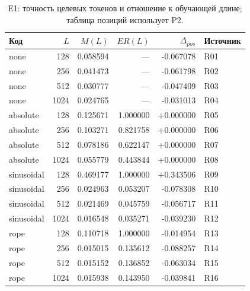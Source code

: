 \begin{table}[H]\centering\small
\setlength{\tabcolsep}{4pt}
\caption{E1: точность целевых токенов и отношение к обучающей длине; таблица позиций использует P2.}\label{tab:e1}
\begin{tabular}{lrrrrl}
\toprule
Код & $L$ & $M(L)$ & $ER(L)$ & $\Delta_{pos}$ & Источник \\
\midrule
none & 128 & 0.058594 & --- & -0.067078 & R01 \\
none & 256 & 0.041473 & --- & -0.061798 & R02 \\
none & 512 & 0.030777 & --- & -0.047409 & R03 \\
none & 1024 & 0.024765 & --- & -0.031013 & R04 \\
absolute & 128 & 0.125671 & 1.000000 & +0.000000 & R05 \\
absolute & 256 & 0.103271 & 0.821758 & +0.000000 & R06 \\
absolute & 512 & 0.078186 & 0.622147 & +0.000000 & R07 \\
absolute & 1024 & 0.055779 & 0.443844 & +0.000000 & R08 \\
sinusoidal & 128 & 0.469177 & 1.000000 & +0.343506 & R09 \\
sinusoidal & 256 & 0.024963 & 0.053207 & -0.078308 & R10 \\
sinusoidal & 512 & 0.021469 & 0.045759 & -0.056717 & R11 \\
sinusoidal & 1024 & 0.016548 & 0.035271 & -0.039230 & R12 \\
rope & 128 & 0.110718 & 1.000000 & -0.014954 & R13 \\
rope & 256 & 0.015015 & 0.135612 & -0.088257 & R14 \\
rope & 512 & 0.015152 & 0.136852 & -0.063034 & R15 \\
rope & 1024 & 0.015938 & 0.143950 & -0.039841 & R16 \\
\bottomrule
\end{tabular}
\end{table}
